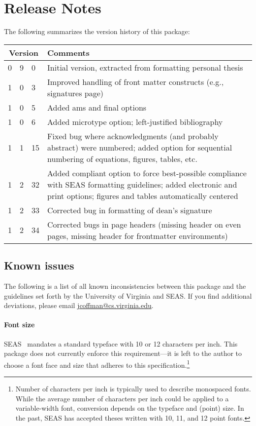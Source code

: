 \documentclass[10pt]{article}
\newcommand{\option}[1]{#1}
\begin{document}


\section{Release Notes}\label{section:release notes}
The following summarizes the version history of this package:
\begin{longtable}{r@{.}r@{.}lp{.8\linewidth}}
  \multicolumn{3}{c}{Version} & Comments\\
  \midrule
  0	& 9	& 0	& Initial version, extracted from formatting personal thesis\\[2ex] %
  1	& 0	& 3	& Improved handling of front matter constructs (e.g., signatures page)\\
  1	& 0	& 5	& Added \option{ams} and \option{final} options\\
  1	& 0	& 6	& Added \option{microtype} option; left-justified bibliography\\
  1	& 1	& 15	& Fixed bug where acknowledgments (and probably abstract) were numbered; added option for sequential numbering of equations, figures, tables, etc.\\
  1	& 2	& 32 	& Added \option{compliant} option to force best-possible compliance with \gls{SEAS} formatting guidelines; added \option{electronic} and \option{print} options; figures and tables automatically centered\\
  1	& 2	& 33	& Corrected bug in formatting of dean's signature\\
  1	& 2	& 34	& Corrected bugs in page headers (missing header on even pages, missing header for frontmatter environments)\\
\end{longtable}

\subsection*{Known issues}
The following is a list of all known inconsistencies between this package and the guidelines set forth by the University of Virginia and \gls{SEAS}.
If you find additional deviations, please email \url{jcoffman@cs.virginia.edu}.

\paragraph{Font size}
\Gls{SEAS}~\cite{seas:instructions} mandates a standard typeface with 10 or 12 characters per inch.
This package does not currently enforce this requirement---it is left to the author to choose a font face and size that adheres to this specification.\footnote{
  Number of characters per inch is typically used to describe monospaced fonts.
  While the average number of characters per inch could be applied to a variable-width font, conversion depends on the typeface and (point) size.
  In the past, \Gls{SEAS} has accepted theses written with 10, 11, and 12 point fonts.
}
\end{document}
